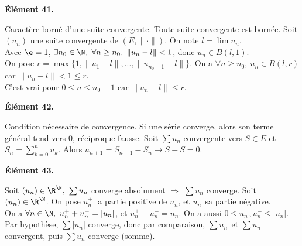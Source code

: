 \documentclass[11pt]{article}
\begin{document}
\begin{center}
    \bf{Élément 41.}
\end{center}

\begin{thm}{Caractère borné d'une suite convergente.  }{}
    Toute suite convergente est bornée.
    \tcblower
    Soit $(u_n)$ une suite convergente de $(E,\|\cdot\|)$. On note $l=\lim u_n$.\\
    Avec $\e=1$, $\exists n_0\in\N, ~ \forall n \geq n_0, ~ \| u_n - l \| < 1$, donc $u_n \in B(l,1)$.\\
    On pose $r=\max \{1, \|u_1-l\|, ..., \|u_{n_0-1} - l\|\}$. On a $\forall n \geq n_0, ~ u_n \in B(l,r)$ car $\|u_n - l\| < 1 \leq r$.\\
    C'est vrai pour $0 \leq n \leq n_0 - 1$ car $\|u_n - l\| \leq r$.
\end{thm}

\pagebreak

\begin{center}
    \bf{Élément 42.}
\end{center}

\begin{prop}{Condition nécessaire de convergence.}{}
    Si une série converge, alors son terme général tend vers 0, réciproque fausse.
    \tcblower
    Soit $\sum u_n$ convergente vers $S\in E$ et $S_n=\sum_{k=0}^nu_k$. Alors $u_{n+1}=S_{n+1}-S_n\to S-S = 0$.
\end{prop}

\vspace*{-0.4cm}

\begin{center}
    \bf{Élément 43.}
\end{center}

\begin{prop}{}{}
    Soit $(u_n)\in\R^\N, ~ \sum u_n$ converge absolument $\Rightarrow$ $\sum u_n$ converge.
    \tcblower
    Soit $(u_n)\in\R^\N$. On pose $u_n^+$ la partie positive de $u_n$, et $u_n^-$ sa partie négative.\\
    On a $\forall n \in \N, ~ u_n^+ + u_n^- = |u_n|$, et $u_n^+-u_n^-=u_n$. On a aussi $0\leq u_n^+,u_n^- \leq |u_n|$.\\
    Par hypothèse, $\sum |u_n|$ converge, donc par comparaison, $\sum u_n^+$ et $\sum u_n^-$ convergent, puis $\sum u_n$ converge (somme).
\end{prop}

\vspace*{-0.4cm}
\end{document}
